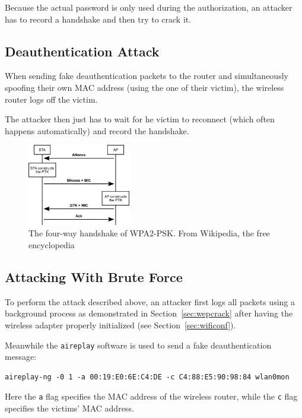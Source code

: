 Because the actual password is only used during the authorization, an attacker has to record a handshake and then try to crack it.

\subsection{Deauthentication Attack}\label{sec:deauth}

When sending fake deauthentication packets to the router and simultaneously spoofing their own MAC address (using the one of their victim), the wireless router logs off the victim.

The attacker then just has to wait for he victim to reconnect (which often happens automatically) and record the handshake.

\begin{figure}
\includegraphics[width=0.4\textwidth]{src/img/4-way-handshake.png}
\caption{The four-way handshake of WPA2-PSK\@. From Wikipedia, the free encyclopedia~\cite{Mikm07}}\label{fig:wpa2fway}
\end{figure}

\subsection{Attacking With Brute Force}\label{sec:wpa2brute}

To perform the attack described above, an attacker first logs all packets using a background process as demonstrated in Section~\ref{sec:wepcrack} after having the wireless adapter properly initialized (see Section~\ref{sec:wificonf}).

Meanwhile the \lstinline{aireplay} software is used to send a fake deauthentication message:

\begin{lstlisting}
aireplay-ng -0 1 -a 00:19:E0:6E:C4:DE -c C4:88:E5:90:98:84 wlan0mon
\end{lstlisting}

Here the \lstinline{a} flag specifies the MAC address of the wireless router, while the \lstinline{c} flag specifies the victims' MAC address.


